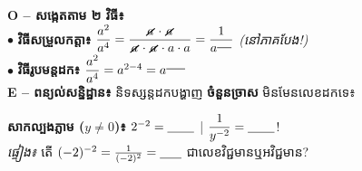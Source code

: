 \documentclass[a4paper,10pt]{article}
\newcommand{\en}[1]{{\TimesEn #1}}
\newcommand{\stk}[1]{\tikz[baseline=(n.base)]{\node[inner sep=0.6pt](n){$#1$}; \draw[black, line width=0.85pt] (n.south west)--(n.north east);}}
\begin{document}
\begin{tcolorbox}
  \textbf{\en{O} -- សង្កេតតាម ២ វិធី៖}\\[2pt]
  $\bullet$ \textbf{វិធីសម្រួលកត្តា៖} $\dfrac{a^2}{a^4} = \dfrac{\stk{a}\cdot\stk{a}}{\stk{a}\cdot\stk{a}\cdot a\cdot a} = \dfrac{1}{a^{\rule{0.40cm}{0.5pt}}}$ \textit{(នៅភាគបែង!)}\\[3pt]
  $\bullet$ \textbf{វិធីរូបមន្តដក៖} $\dfrac{a^2}{a^4} = a^{2-4} = a^{\rule{0.52cm}{0.5pt}}$\\[5pt]
  \textbf{\en{E} -- ពន្យល់សន្និដ្ឋាន៖} និទស្សន្តដកបង្ហាញ \textbf{ចំនួនច្រាស} មិនមែនលេខដកទេ៖\par\vspace{4pt}
  {\centering{}\par}\vspace{5pt}
  \begin{tcolorbox}[enhanced, sharp corners, colback=panelgray, colframe=black, boxrule=0.7pt, boxsep=1pt, top=3.5pt, bottom=3.5pt, left=4.5pt, right=4.5pt]
    \raggedright\fontsize{7.55pt}{10.8pt}\selectfont
    \textbf{សាកល្បងភ្លាម ($y\neq 0$)៖} $2^{-2} = \underline{\hspace{0.75cm}}$ \quad | \quad $\dfrac{1}{y^{-2}} = \underline{\hspace{0.75cm}}$!\\[2pt]
    \textit{ផ្ទៀង៖} តើ $(-2)^{-2} = \frac{1}{(-2)^2} = \underline{\hspace{0.6cm}}$ ជាលេខវិជ្ជមានឬអវិជ្ជមាន?
  \end{tcolorbox}
\end{tcolorbox}

\vspace{7pt}
\end{document}
